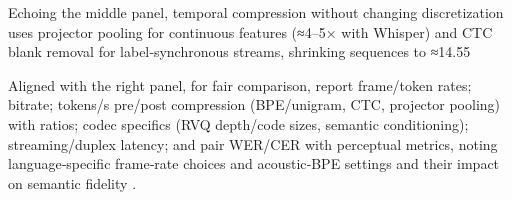 \documentclass{article}
\begin{document}
Echoing the middle panel, temporal compression without changing discretization uses projector pooling for continuous features (≈4–5× with Whisper) and CTC blank removal for label‑synchronous streams, shrinking sequences to ≈14.55%

Aligned with the right panel, for fair comparison, report frame/token rates; bitrate; tokens/s pre/post compression (BPE/unigram, CTC, projector pooling) with ratios; codec specifics (RVQ depth/code sizes, semantic conditioning); streaming/duplex latency; and pair WER/CER with perceptual metrics, noting language‑specific frame‑rate choices and acoustic‑BPE settings and their impact on semantic fidelity \cite{li2024effectivenessacousticbpedecoderonlytts,ye2024codecdoesmatterexploringsemanticshortcom,zhang2025impactframeratesspeechtokenizercasestudy}.

\end{document}
